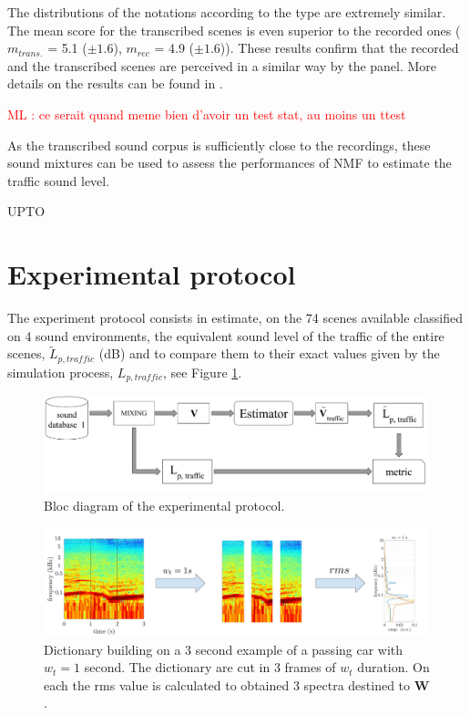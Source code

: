\documentclass[review,5p,twocolumn,sort&compress,times]{elsarticle}
\newcommand{\ml}[1]{\textcolor{red}{ML : #1}}
\begin{document}
The distributions of the notations according to the type are extremely similar. The mean score for the transcribed scenes is even superior to the recorded ones ($m_{trans.}$ = 5.1 ($\pm 1.6$), $m_{rec}$ = 4.9 ($\pm 1.6$)). These results confirm that the recorded and the transcribed scenes are perceived in a similar way by the panel. More details on the results can be found in  \cite{gloaguen_creation_2017}.

\ml{ce serait quand meme bien d'avoir un test stat, au moins un ttest}

As the transcribed sound corpus is sufficiently close to the recordings, these sound mixtures can be used to assess the performances of NMF to estimate the traffic sound level.

UPTO

\section{Experimental protocol}\label{part:expProtocol}

The experiment protocol consists in estimate, on the 74 scenes available classified on 4 sound environments, the equivalent sound level of the traffic of the entire scenes, $\tilde{L}_{p, traffic}$ (dB) and to compare them to their exact values given by the simulation process, $L_{p,traffic}$, see Figure \ref{fig:bloc_diagram_estimator}.

\begin{figure}[t]
\centering
\includegraphics[width=.9\linewidth]{figures/bloc_diagram_estimator.pdf}
\caption{Bloc diagram of the experimental protocol.}
\label{fig:bloc_diagram_estimator}
\end{figure}

\begin{figure}[t]
\centering
\includegraphics[width=0.8\linewidth]{figures/extractionDictionary2.pdf}
\caption{Dictionary building on a 3 second example of a passing car with $w_t = 1$ second. The dictionary are cut in 3 frames of $w_t$ duration. On each the rms value is calculated to obtained 3 spectra destined to $\mathbf{W}$.}
\label{fig:example_dictionary}
\end{figure}
\end{document}
